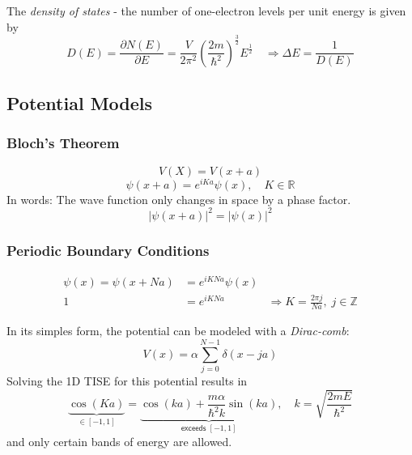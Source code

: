 \newpar{}

The \textit{density of states} - the number of one-electron levels per unit energy is given by
\noindent\begin{equation*}
    D(E)=\frac{\partial N(E)}{\partial E} = \frac{V}{2\pi^2}{\left(\frac{2m}{\hbar^2}\right)}^{\frac{3}{2}} E^{\frac{1}{2}} \quad \Rightarrow \Delta E = \frac{1}{D(E)}
\end{equation*}

\subsection{Potential Models}
\subsubsection{Bloch's Theorem}
\noindent\begin{equation*}
    V(X) = V(x+a)
\end{equation*}
\noindent\begin{equation*}
    \psi(x+a) = e^{iKa} \psi(x), \quad K\in \mathbb{R}
\end{equation*}
In words: The wave function only changes in space by a phase factor.
\noindent\begin{equation*}
    {|\psi(x+a)|}^2={|\psi(x)|}^2
\end{equation*}

\subsubsection{Periodic Boundary Conditions}
\noindent\begin{align*}
    \psi(x) = \psi(x+Na) & = e^{iKNa}\psi(x)                                                       \\
    1                    & =e^{iKNa}         & \Rightarrow K=\frac{2\pi j}{Na}, \; j\in \mathbb{Z}
\end{align*}


In its simples form, the potential can be modeled with a \textit{Dirac-comb}:
\noindent\begin{equation*}
    V(x)=\alpha\sum_{j=0}^{N-1}\delta(x-ja)
\end{equation*}
Solving the 1D TISE for this potential results in
\noindent\begin{equation*}
    \underbrace{\cos(Ka)}_{\in [-1,1]} = \underbrace{\cos(ka) + \frac{m\alpha}{\hbar^2 k}\sin(ka)}_{\textsf{exceeds }[-1,1]}, \quad k=\sqrt{\frac{2mE}{\hbar^2}}
\end{equation*}
and only certain bands of energy are allowed.

